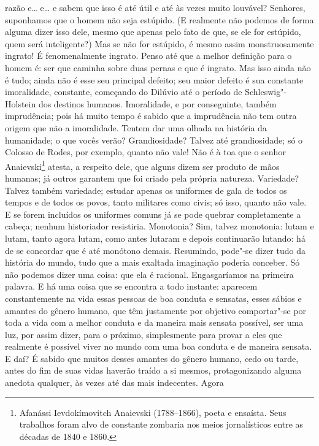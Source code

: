 razão e\ldots{} e\ldots{} e sabem que isso é até útil e até às vezes muito
louvável? Senhores, suponhamos que o homem não seja estúpido. (E realmente não
podemos de forma alguma dizer isso dele, mesmo que apenas pelo fato de que, se
ele for estúpido, quem será inteligente?) Mas se não for estúpido, é mesmo
assim monstruosamente ingrato! É fenomenalmente ingrato. Penso até que a melhor
definição para o homem é: ser que caminha sobre duas pernas e que é ingrato.
Mas isso ainda não é tudo; ainda não é esse seu principal defeito; seu maior
defeito é sua constante imoralidade, constante, começando do Dilúvio até o
período de Schleswig"-Holstein dos destinos humanos. Imoralidade, e por
conseguinte, também imprudência; pois há muito tempo é sabido que a imprudência
não tem outra origem que não a imoralidade. Tentem dar uma olhada na história
da humanidade; o que vocês verão? Grandiosidade? Talvez até grandiosidade; só o
Colosso de Rodes, por exemplo, quanto não vale! Não é à toa que o senhor
Anaievski\footnote{ Afanássi Ievdokímovitch Anaievski (1788--1866), poeta e
ensaísta. Seus trabalhos foram alvo de constante zombaria nos meios
jornalísticos entre as décadas de 1840 e 1860.} atesta, a respeito dele, que
alguns dizem ser produto de mãos humanas; já outros garantem que foi criado pela
própria natureza. Variedade? Talvez também variedade; estudar apenas os
uniformes de gala de todos os tempos e de todos os povos, tanto militares como
civis; só isso, quanto não vale. E se forem incluídos os uniformes comuns já se
pode quebrar completamente a cabeça; nenhum historiador resistiria. Monotonia?
Sim, talvez monotonia: lutam e lutam, tanto agora lutam, como antes lutaram e
depois continuarão lutando: há de se concordar que é até monótono demais.
Resumindo, pode"-se dizer tudo da história do mundo, tudo que a mais exaltada
imaginação poderia conceber. Só não podemos dizer uma coisa: que ela é
racional. Engasgaríamos na primeira palavra. E há uma coisa que se encontra a
todo instante: aparecem constantemente na vida essas pessoas de boa conduta e
sensatas, esses sábios e amantes do gênero humano, que têm justamente por
objetivo comportar"-se por toda a vida com a melhor conduta e da maneira mais
sensata possível, ser uma luz, por assim dizer, para o próximo, simplesmente
para provar a eles que realmente é possível viver no mundo com uma boa conduta
e de maneira sensata. E daí? É sabido que muitos desses amantes do gênero
humano, cedo ou tarde, antes do fim de suas vidas haverão traído a si mesmos,
protagonizando alguma anedota qualquer, às vezes até das mais indecentes. Agora
